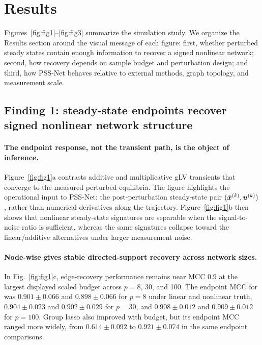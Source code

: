 \section{Results}
\label{sec:results}

Figures~\ref{fig:fig1}--\ref{fig:fig3} summarize the simulation study. We
organize the Results section around the visual message of each figure: first,
whether perturbed steady states contain enough information to recover a signed
nonlinear network; second, how recovery depends on sample budget and
perturbation design; and third, how PSS-Net behaves relative to external
methods, graph topology, and measurement scale.

\subsection{Finding 1: steady-state endpoints recover signed nonlinear network
structure}
\label{sec:res:foundation}

\paragraph{The endpoint response, not the transient path, is the object of
inference.}
Figure~\ref{fig:fig1}a contrasts additive and multiplicative gLV transients that
converge to the measured perturbed equilibria. The figure highlights the
operational input to PSS-Net: the post-perturbation steady-state pair
$(\tilde{\bm{x}}^{(k)},\bm{u}^{(k)})$, rather than numerical derivatives along the
trajectory. Figure~\ref{fig:fig1}b then shows that nonlinear steady-state
signatures are separable when the signal-to-noise ratio is sufficient, whereas
the same signatures collapse toward the linear/additive alternatives under
larger measurement noise.

\paragraph{Node-wise \adsiht{} gives stable directed-support recovery across
network sizes.}
In Fig.~\ref{fig:fig1}c, edge-recovery performance remains near MCC 0.9 at the
largest displayed scaled budget across $p=8$, 30, and 100. The endpoint MCC for
\adsiht{} was $0.901\pm0.066$ and $0.898\pm0.066$ for $p=8$ under linear and
nonlinear truth, $0.904\pm0.023$ and $0.902\pm0.029$ for $p=30$, and
$0.908\pm0.012$ and $0.909\pm0.012$ for $p=100$. Group lasso also improved
with budget, but its endpoint MCC ranged more widely, from $0.614\pm0.092$ to
$0.921\pm0.074$ in the same endpoint comparisons.

